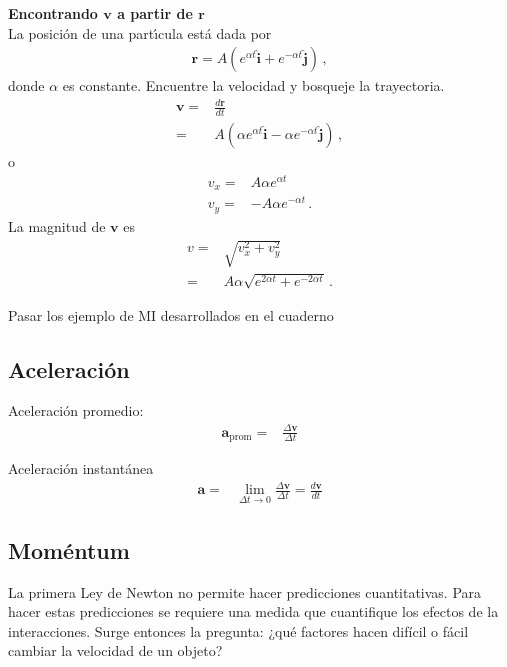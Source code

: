 \ejemplo{}
\textbf{Encontrando $\mathbf{v}$ a partir de $\mathbf{r}$}\\
La posici\'on de una part\'\i cula est\'a dada por
\begin{align}
  \mathbf{r}=A(e^{\alpha t}\hat{\mathbf{i}}+e^{-\alpha t}\hat{\mathbf{j}})\,,
\end{align}
donde $\alpha$ es constante. Encuentre la velocidad y bosqueje la trayectoria.
\begin{align}
    \mathbf{v}=&\frac{d\mathbf{r}}{dt}\nonumber\\
    =&A(\alpha e^{\alpha t}\hat{\mathbf{i}}-\alpha e^{-\alpha t}\hat{\mathbf{j}})\,,
\end{align}
o
\begin{align}
  v_x=&A\alpha e^{\alpha t}\nonumber\\
  v_y=&-A\alpha e^{-\alpha t}\,.
\end{align}
La magnitud de $\mathbf{v}$ es
\begin{align}
  v=&\sqrt{v_x^2+v_y^2}\nonumber\\
  =&A\alpha\sqrt{e^{2\alpha t}+e^{-2\alpha t}}\,.
\end{align}

\begin{inprogress}
  Pasar los ejemplo de MI desarrollados en el cuaderno
\end{inprogress}
\finejemplo

\subsection{Aceleración}

Aceleración promedio:
\begin{align}
  \mathbf{a}_{\text{prom}}=&\frac{\Delta \mathbf{v}}{\Delta t}
\end{align}

Aceleración instantánea
\begin{align}
  \mathbf{a}=&\lim_{\Delta t\to 0}\frac{\Delta \mathbf{v}}{\Delta t}=\frac{d\mathbf{v}}{dt}
\end{align}

\subsection{Moméntum}

La primera Ley de Newton no permite hacer predicciones cuantitativas. Para hacer estas predicciones se requiere una medida que cuantifique los efectos de la interacciones. Surge entonces la pregunta: ¿qué factores hacen difícil o fácil cambiar la velocidad de un objeto?

